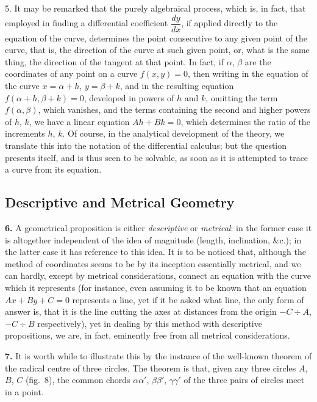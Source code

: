 \documentclass[11pt,a4paper]{article}
\theoremstyle{definition}
\begin{document}
5. It may be remarked that the purely algebraical process, which is, in fact, that employed in finding a differential coefficient $\dfrac{dy}{dx}$, if applied directly to the equation of the curve, determines the point consecutive to any given point of the curve, that is, the direction of the curve at such given point, or, what is the same thing, the direction of the tangent at that point. In fact, if $\alpha$, $\beta$ are the coordinates of any point on a curve $f(x,y)=0$, then writing in the equation of the curve $x=\alpha+h$, $y=\beta+k$, and in the resulting equation $f(\alpha+h,\beta+k)=0$, developed in powers of $h$ and $k$, omitting the term $f(\alpha,\beta)$, which vanishes, and the terms containing the second and higher powers of $h$, $k$, we have a linear equation $Ah+Bk=0$, which determines the ratio of the increments $h$, $k$. Of course, in the analytical development of the theory, we translate this into the notation of the differential calculus; but the question presents itself, and is thus seen to be solvable, as soon as it is attempted to trace a curve from its equation.

\subsection*{Descriptive and Metrical Geometry}

\textbf{6.} A geometrical proposition is either \textit{descriptive} or \textit{metrical}: in the former case it is altogether independent of the idea of magnitude (length, inclination, \&c.); in the latter case it has reference to this idea. It is to be noticed that, although the method of coordinates seems to be by its inception essentially metrical, and we can hardly, except by metrical considerations, connect an equation with the curve which it represents (for instance, even assuming it to be known that an equation $Ax+By+C=0$ represents a line, yet if it be asked what line, the only form of answer is, that it is the line cutting the axes at distances from the origin $-C\div A$, $-C\div B$ respectively), yet in dealing by this method with descriptive propositions, we are, in fact, eminently free from all metrical considerations.

\textbf{7.} It is worth while to illustrate this by the instance of the well-known theorem of the radical centre of three circles. The theorem is that, given any three circles $A$, $B$, $C$ (fig.~8), the common chords $\alpha\alpha'$, $\beta\beta'$, $\gamma\gamma'$ of the three pairs of circles meet in a point.
\end{document}
